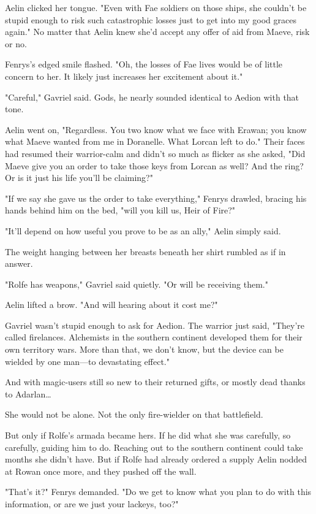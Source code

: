 Aelin clicked her tongue. "Even with Fae soldiers on those ships, she couldn't be stupid enough to risk such catastrophic losses just to get into my good graces again." No matter that Aelin knew she'd accept any offer of aid from Maeve, risk or no.

Fenrys's edged smile flashed. "Oh, the losses of Fae lives would be of little concern to her. It likely just increases her excitement about it."

"Careful," Gavriel said. Gods, he nearly sounded identical to Aedion with that tone.

Aelin went on, "Regardless. You two know what we face with Erawan; you know what Maeve wanted from me in Doranelle. What Lorcan left to do." Their faces had resumed their warrior-calm and didn't so much as flicker as she asked, "Did Maeve give you an order to take those keys from Lorcan as well? And the ring? Or is it just his life you'll be claiming?"

"If we say she gave us the order to take everything," Fenrys drawled, bracing his hands behind him on the bed, "will you kill us, Heir of Fire?"

"It'll depend on how useful you prove to be as an ally," Aelin simply said.

The weight hanging between her breasts beneath her shirt rumbled as if in answer.

"Rolfe has weapons," Gavriel said quietly. "Or will be receiving them."

Aelin lifted a brow. "And will hearing about it cost me?"

Gavriel wasn't stupid enough to ask for Aedion. The warrior just said, "They're called firelances. Alchemists in the southern continent developed them for their own territory wars. More than that, we don't know, but the device can be wielded by one man---to devastating effect."

And with magic-users still so new to their returned gifts, or mostly dead thanks to Adarlan\ldots{}

She would not be alone. Not the only fire-wielder on that battlefield.

But only if Rolfe's armada became hers. If he did what she was carefully, so carefully, guiding him to do. Reaching out to the southern continent could take months she didn't have. But if Rolfe had already ordered a supply  Aelin nodded at Rowan once more, and they pushed off the wall.

"That's it?" Fenrys demanded. "Do we get to know what you plan to do with this information, or are we just your lackeys, too?"

